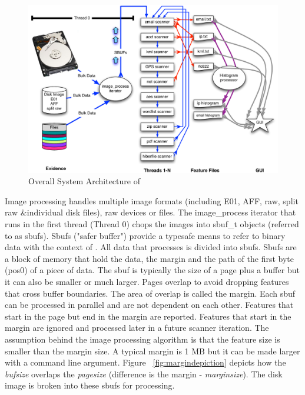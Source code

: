 \documentclass[11pt,fleqn]{article} %
\begin{document}
\begin{figure}
	\includegraphics[scale=.50]{system_diagram.pdf}
	\caption{Overall System Architecture of \bulk }
	\label{fig:systemdiagram}
\end{figure}


Image processing handles multiple image formats (including E01, AFF, raw, split raw \&individual disk files), raw devices or files. The image\_process iterator that runs in the first thread (Thread 0) chops the images into sbuf\_t objects (referred to as sbufs). Sbufs ("safer buffer") provide a typesafe means to refer to binary data with the context of \bulk. All data that \bulk processes is divided into sbufs. Sbufs are a block of memory that hold the data, the margin and the path of the first byte (pos0) of a piece of data. The sbuf is typically the size of a page plus a buffer but it can also be smaller or much larger. Pages overlap to avoid dropping features that cross buffer boundaries.  The area of overlap is called the margin.  Each sbuf can be processed in parallel and are not dependent on each other. Features that start in the page but end in the margin are reported. Features that start in the margin are ignored and processed later in a future scanner iteration. The assumption behind the image processing algorithm is that the feature size is smaller than the margin size. A typical margin is 1 MB but it can be made larger with a command line argument. Figure ~\ref{fig:margindepiction} depicts how the \textit{bufsize} overlaps the \textit{pagesize} (difference is the margin - \textit{marginsize}). The disk image is broken into these sbufs for processing. \\
\end{document}
